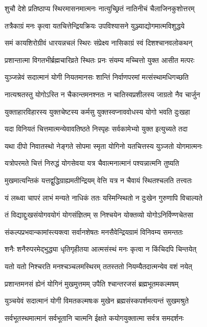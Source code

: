 \twolineshloka
{शुचौ देशे प्रतिष्ठाप्य स्थिरमासनमात्मनः}
{नात्युच्छ्रितं नातिनीचं चैलाजिनकुशोत्तरम्}


\twolineshloka
{तत्रैकाग्रं मनः कृत्वा यतचित्तेन्द्रियक्रियः}
{उपविश्यासने युञ्ज्याद्योगमात्मविशुद्धये}


\twolineshloka
{समं कायशिरोग्रीवं धारयन्नचलं स्थिरः}
{संप्रेक्ष्य नासिकाग्रं स्वं दिशश्चानवलोकथन्}


\twolineshloka
{प्रशान्तात्मा विगतभीर्ब्रह्मचारिव्रते स्थितः}
{प्रनः संयम्य मच्चित्तो युक्त आसीत मत्परः}


\twolineshloka
{युञ्जन्नेवं सदात्मानं योगी नियतमानसः}
{शान्तिं निर्वाणपरमां मत्संस्थामधिगच्छति}


\twolineshloka
{नात्यश्रतस्तु योगोऽस्ति न चैकान्तमनश्नतः}
{न चातिस्वप्रशीलस्य जाग्रतो नैव चार्जुन}


\twolineshloka
{युक्ताहारविहारस्य युक्तचेष्टस्य कर्मसु}
{युक्तस्वप्नाववोधस्य योगो भवति दुःखहा}


\twolineshloka
{यदा विनियतं चित्तमात्मन्येवावतिष्ठते}
{निस्पृहः सर्वकामेभ्यो युक्त इत्युच्यते तदा}


\twolineshloka
{यथा दीपो निवातस्थो नेङ्गते सोपमा स्मृता}
{योगिनो यतचित्तस्य युञ्जतो योगमात्मनः}


\twolineshloka
{यत्रोपरमते चित्तं निरुद्धं योगसेवया}
{यत्र चैवात्मनात्मानं पश्यन्नात्मनि तुष्यति}


\twolineshloka
{मुखमात्यन्तिकं यत्तद्वुद्धिग्राह्यमतीन्द्रियम्}
{वेत्ति यत्र न चैवायं स्थितश्चलति तत्त्वतः}


\twolineshloka
{यं लब्ध्वा चापरं लाभं मन्यते नाधिकं ततः}
{यस्मिन्स्थितो न दुःखेन गुरुणापि विचाल्यते}


\twolineshloka
{तं विद्याद्दुःखसंयोगवयोगं योगसंज्ञितम्}
{स निश्चयेन योक्तव्यो योगोऽनिर्विण्णचेतसा}


\twolineshloka
{संकल्पप्रभवान्कामांस्त्यक्त्वा सर्वानशेषतः}
{मनसैवेन्द्रियग्रामं विनिवम्य समन्ततः}


\twolineshloka
{शनैः शनैरुपरमेद्भुद्ध्या धृतिगृहीतया}
{आत्मसंस्थं मनः कृत्वा न किंचिदपि चिन्तयेत्}


\twolineshloka
{यतो यतो निश्चरति मनश्चञ्चलमस्थिरम्}
{ततस्ततो नियम्यैतदात्मन्येव वशं नयेत्}


\twolineshloka
{प्रशान्तमनसं ह्येनं योगिनं मुखमुत्तमम्}
{उपैति श्चान्तरजसं ब्रह्मभूतमकल्मषम्}


\twolineshloka
{युञ्चयेवं सदात्मानं योगी विमतकल्मषःक}
{मुखेन ब्रह्मसंस्कपर्शमत्यन्तं सुखमश्रुते}


\twolineshloka
{सर्वभूतस्थमात्मानं सर्वभूतानि चात्मनि}
{ईक्षते कयोगयुक्तात्मा सर्वत्र समदर्शनः}


